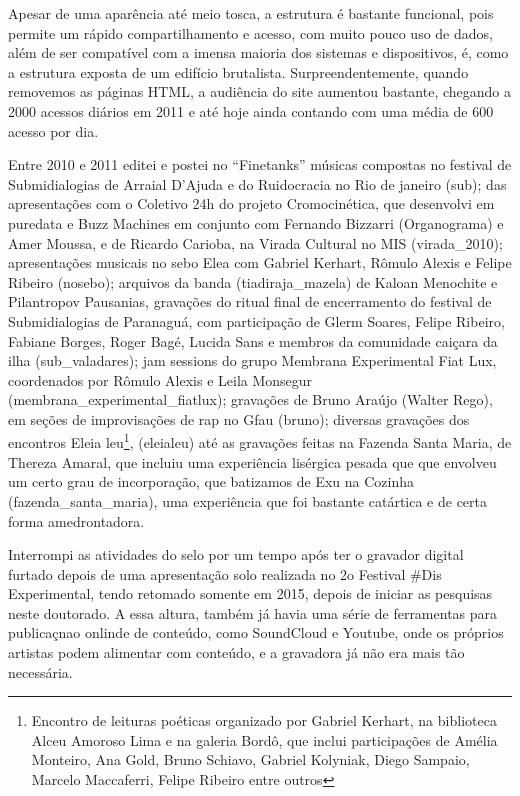 Apesar de uma aparência até meio tosca, a estrutura é bastante funcional, pois permite um rápido compartilhamento e acesso, com muito pouco uso de dados, além de ser compatível com a imensa maioria dos sistemas e dispositivos, é, como a estrutura exposta de um edifício brutalista. Surpreendentemente, quando removemos as páginas HTML, a audiência do site aumentou bastante, chegando a 2000 acessos diários em 2011 e até hoje ainda contando com uma média de 600 acesso por dia.




Entre 2010 e 2011 editei e postei no ``Finetanks'' músicas compostas no festival de Submidialogias de Arraial D'Ajuda e do Ruidocracia no Rio de janeiro (\/sub\/); das apresentações com o Coletivo 24h do projeto Cromocinética, que desenvolvi em puredata e Buzz Machines em conjunto com Fernando Bizzarri (Organograma) e Amer Moussa, e de Ricardo Carioba, na Virada Cultural no MIS (virada\_2010\/); apresentações musicais no sebo Elea com Gabriel Kerhart, Rômulo Alexis e Felipe Ribeiro (nosebo\/); arquivos da banda (tiadiraja\_mazela\/) de Kaloan Menochite e Pilantropov Pausanias, gravações do ritual final de encerramento do festival de Submidialogias de Paranaguá, com participação de Glerm Soares, Felipe Ribeiro, Fabiane Borges, Roger Bagé, Lucida Sans e membros da comunidade caiçara da ilha (\/sub\_valadares\/); jam sessions do grupo Membrana Experimental Fiat Lux, coordenados por Rômulo Alexis e Leila Monsegur (membrana\_experimental\_fiatlux\/); gravações de Bruno Araújo (Walter Rego), em seções de improvisações de rap no Gfau (bruno\/); diversas gravações dos encontros Eleia leu\footnote{Encontro de leituras poéticas organizado por Gabriel Kerhart, na biblioteca Alceu Amoroso Lima e na galeria Bordô, que inclui participações de Amélia Monteiro, Ana Gold, Bruno Schiavo, Gabriel Kolyniak, Diego Sampaio, Marcelo Maccaferri, Felipe Ribeiro entre outros}, (\/eleialeu\/) até as gravações feitas na Fazenda Santa Maria, de Thereza Amaral, que incluiu uma experiência lisérgica pesada que que envolveu um certo grau de incorporação, que batizamos de Exu na Cozinha (\/fazenda\_santa\_maria\/), uma experiência que foi bastante catártica e de certa forma amedrontadora. 

Interrompi as atividades do selo por um tempo após ter o gravador digital furtado depois de uma apresentação solo realizada no 2o Festival \#Dis Experimental, tendo retomado somente em 2015, depois de iniciar as pesquisas neste doutorado. A essa altura, também já havia uma série de ferramentas para publicaçnao onlinde de conteúdo, como SoundCloud e Youtube, onde os próprios artistas podem alimentar com conteúdo, e a gravadora já não era mais tão necessária.



